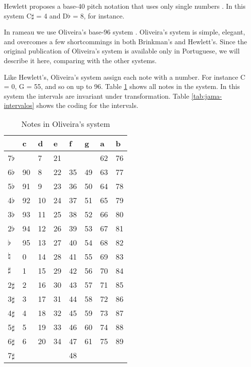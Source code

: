 \documentclass{article}
\begin{document}
Hewlett proposes a base-40 pitch notation that uses only single
numbers \cite{hewlett92:base40}. In this system C$\sharp$ = 4 and
D$\flat$ = 8, for instance.

In rameau we use Oliveira's base-96 system
\cite{oliveira01:codificacao}. Oliveira's system is simple, elegant,
and overcomes a few shortcommings in both Brinkman's and Hewlett's.
Since the original publication of Oliveira's system is available only
in Portuguese, we will describe it here, comparing with the other
systems.

Like Hewlett's, Oliveira's system assign each note with a number. For
instance C = 0, G = 55, and so on up to 96. Table
\ref{tab:jama-notas} shows all notes in the system. In this system the
intervals are invariant under transformation. Table
\ref{tab:jama-intervalos} shows the coding for the intervals.

\begin{table}
  \centering
  \begin{tabular}{l|lllllll}
               & c & d& e& f& g& a& b \\
    \hline
    7$\flat$   &   & 7&21&  &  &62&76 \\
    6$\flat$   & 90& 8&22&35&49&63&77 \\
    5$\flat$   & 91& 9&23&36&50&64&78 \\
    4$\flat$   & 92&10&24&37&51&65&79 \\
    3$\flat$   & 93&11&25&38&52&66&80 \\
    2$\flat$   & 94&12&26&39&53&67&81 \\
    $\flat$    & 95&13&27&40&54&68&82 \\
    $\natural$ &  0&14&28&41&55&69&83 \\
    $\sharp$   &  1&15&29&42&56&70&84 \\
    2$\sharp$  &  2&16&30&43&57&71&85 \\
    3$\sharp$  &  3&17&31&44&58&72&86 \\
    4$\sharp$  &  4&18&32&45&59&73&87 \\
    5$\sharp$  &  5&19&33&46&60&74&88 \\
    6$\sharp$  &  6&20&34&47&61&75&89 \\
    7$\sharp$  &   &  &  &48&  &  &   \\
  \end{tabular}
  \caption{Notes in Oliveira's system}
  \label{tab:jama-notas}
\end{table}
\end{document}
